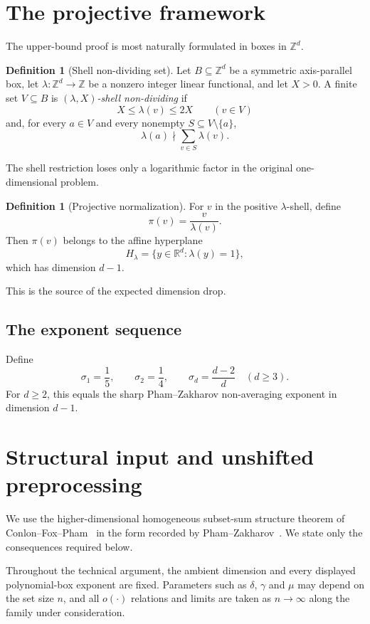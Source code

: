 \documentclass[11pt,reqno]{amsart}
\theoremstyle{definition}
\newtheorem{definition}[theorem]{Definition}
\theoremstyle{remark}
\newcommand{\Z}{\mathbb Z}
\newcommand{\R}{\mathbb R}
\begin{document}
\section{The projective framework}
\label{sec:projective-framework}

The upper-bound proof is most naturally formulated in boxes in $\Z^d$.

\begin{definition}[Shell non-dividing set]
Let $B\subseteq\Z^d$ be a symmetric axis-parallel box, let $\lambda:\Z^d\to\Z$ be a nonzero integer linear functional, and let $X>0$.  A finite set $V\subseteq B$ is \emph{$(\lambda,X)$-shell non-dividing} if
\[
 X\le \lambda(v)\le2X
 \qquad(v\in V)
\]
and, for every $a\in V$ and every nonempty $S\subseteq V\setminus\{a\}$,
\[
 \lambda(a)\nmid \sum_{v\in S}\lambda(v).
\]
\end{definition}

The shell restriction loses only a logarithmic factor in the original one-dimensional problem.

\begin{definition}[Projective normalization]
For $v$ in the positive $\lambda$-shell, define
\[
   \pi(v)=\frac{v}{\lambda(v)}.
\]
Then $\pi(v)$ belongs to the affine hyperplane
\[
   H_\lambda=\{y\in\R^d:\lambda(y)=1\},
\]
which has dimension $d-1$.
\end{definition}

This is the source of the expected dimension drop.

\subsection{The exponent sequence}

Define
\[
 \sigma_1=\frac15,
 \qquad
 \sigma_2=\frac14,
 \qquad
 \sigma_d=\frac{d-2}{d}\quad(d\ge3).
\]
For $d\ge2$, this equals the sharp Pham--Zakharov non-averaging exponent in dimension $d-1$.

\section{Structural input and unshifted preprocessing}
\label{sec:technical-package}

We use the higher-dimensional homogeneous subset-sum structure theorem of
Conlon--Fox--Pham~\cite{CFPHomogeneous} in the form recorded by
Pham--Zakharov~\cite[Corollary~5]{PhamZakharov}.  We state only the
consequences required below.

Throughout the technical argument, the ambient dimension and every displayed
polynomial-box exponent are fixed.  Parameters such as $\delta$, $\gamma$ and
$\mu$ may depend on the set size $n$, and all $o(\cdot)$ relations and limits
are taken as $n\to\infty$ along the family under consideration.
\end{document}
